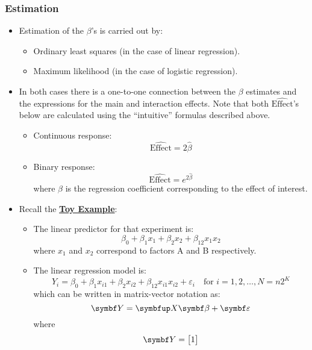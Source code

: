 \subsubsection*{Estimation}
\begin{itemize}
    \item Estimation of the $ \beta $'s is carried out by:
          \begin{itemize}[$\hookrightarrow$]
              \item Ordinary least squares (in the case of linear regression).
              \item Maximum likelihood (in the case of logistic regression).
          \end{itemize}
    \item In both cases there is a one-to-one connection between the $ \beta $ estimates and the expressions for the
          main and interaction effects. Note that both $ \widehat{\text{Effect}} $'s below
          are calculated using the ``intuitive'' formulas described above.
          \begin{itemize}
              \item Continuous response:
                    \[ \widehat{\text{Effect}}=2\hat{\beta} \]
              \item Binary response:
                    \[ \widehat{\text{Effect}}=e^{2\hat{\beta}} \]
                    where $ \beta $ is the regression coefficient corresponding to the effect of interest.
          \end{itemize}
    \item Recall the \hyperref[ex:toy_ex]{\textbf{Toy Example}}:
          \begin{itemize}
              \item The linear predictor for that experiment is:
                    \[ \beta_0+\beta_1x_1+\beta_2x_2+\beta_{12}x_1x_2 \]
                    where $ x_1 $ and $ x_2 $ correspond to factors A and B respectively.
              \item The linear regression model is:
                    \[ Y_i=\beta_0+\beta_1x_{i1}+\beta_2x_{i2}+\beta_{12}x_{i1}x_{i2}+\varepsilon_i\quad \text{for }i=1,2,\ldots,N=n2^K \]
                    which can be written in matrix-vector notation as:
                    \[ \RandomVector{Y}=\Matrix{X}\Vector{\beta}+\RandomVector{\varepsilon} \]
                    where
                    \[ \RandomVector{Y}=\begin{bmatrix}
                            1 \\

\end{bmatrix}\]
\end{itemize}
\end{itemize}

